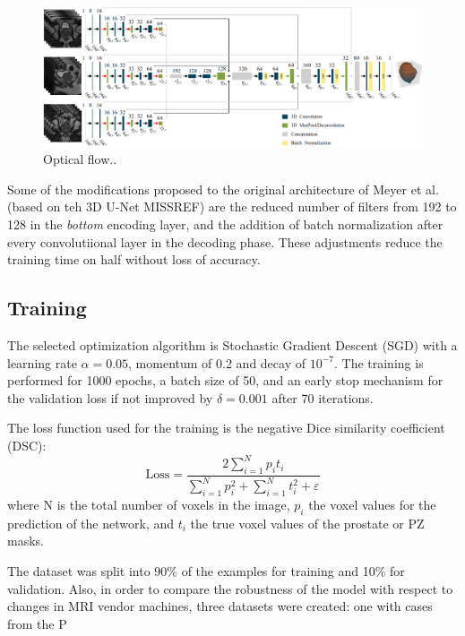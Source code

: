 \begin{figure}[h]
    \centering
    \includegraphics[totalheight=.3\textheight]{imgs/methodology/NN.png}
    \caption{Optical flow..}
    \label{fig:nn}
\end{figure}

Some of the modifications proposed to the original architecture of Meyer et al. \cite{anneke} 
(based on teh 3D U-Net MISSREF)
are the reduced number of filters from 192 to 128 in the \emph{bottom} encoding layer, and
the addition of batch normalization after every convolutiional layer 
in the decoding phase. These adjustments reduce the training time on half without
loss of accuracy. 

\subsection{Training}
\label{subsec:training}
The selected optimization algorithm is Stochastic Gradient Descent (SGD) with a
learning rate $\alpha = 0.05$, momentum of 0.2 and decay of $10^{-7}$. The training is performed
for 1000 epochs, a batch size of 50, and an early stop mechanism for the validation
loss if not improved by $\delta = 0.001$ after 70 iterations. 

The loss function used for the training is the negative Dice similarity coefficient (DSC):
\begin{equation}
\text{Loss} = \frac{2 \sum_{i=1}^{N}p_it_i}{\sum_{i=1}^{N}p_i^2 + \sum_{i=1}^{N}t_i^2 + \varepsilon} 
\label{eq:dsc}
\end{equation}
where N is the total number of voxels in the image, $p_i$ the voxel values for the 
prediction of the network, and $t_i$ the true voxel values of the prostate or PZ masks.

The dataset was split into 90\% of the examples for training and 10\% for
validation. Also, in order to compare the robustness of the model with respect to changes
in MRI vendor machines, three datasets were created: one with cases from the P
